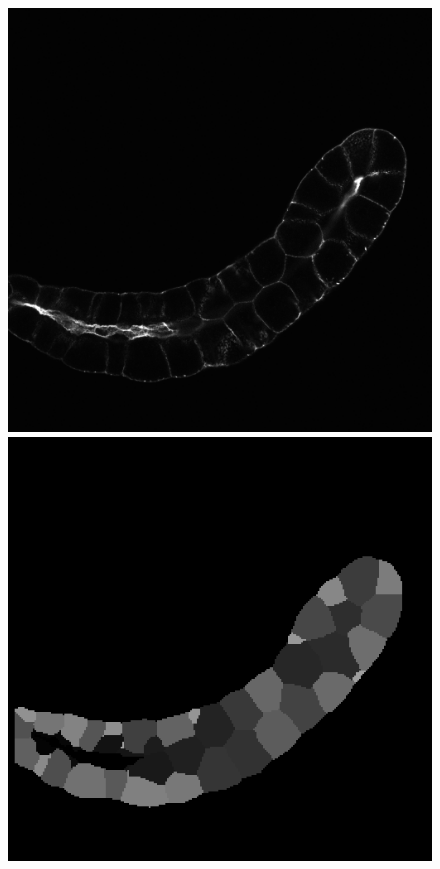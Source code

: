 \begin{figure}[ht]
\includegraphics[scale=0.18]{img/raw 04_1a Z=100.png}
\includegraphics[scale=0.18]{img/target 04_1a Z=77.png}

\end{figure}

